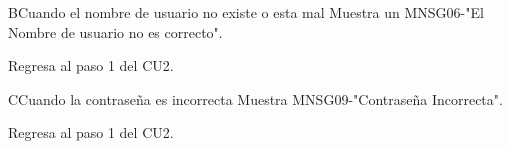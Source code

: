 \begin{UCtrayectoriaA}{B}{Cuando el nombre de usuario no existe o esta mal}
 	\UCpaso Muestra un MNSG06-"El Nombre de usuario no es correcto".
     \item \UCactor Regresa al paso 1 del CU2.
\end{UCtrayectoriaA}
 
 
\begin{UCtrayectoriaA}{C}{Cuando la contraseña es incorrecta}
  	\UCpaso Muestra MNSG09-"Contraseña Incorrecta".
  	\item \UCactor Regresa al paso 1 del CU2.
\end{UCtrayectoriaA}
